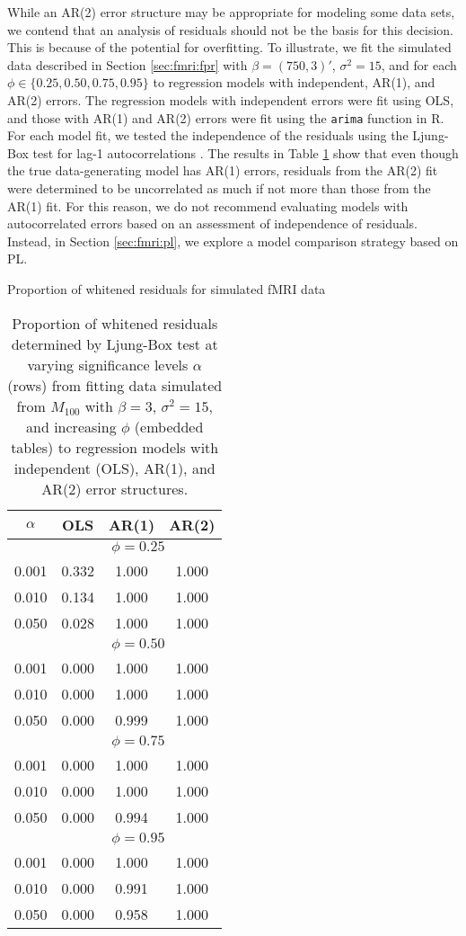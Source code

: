 While an AR(2) error structure may be appropriate for modeling some data sets, we contend that an analysis of residuals should not be the basis for this decision. This is because of the potential for overfitting. To illustrate, we fit the simulated data described in Section \ref{sec:fmri:fpr} with $\beta = (750,3)'$, $\sigma^2 = 15$, and for each $\phi \in \{0.25,0.50,0.75,0.95\}$ to regression models with independent, AR(1), and AR(2) errors. The regression models with independent errors were fit using OLS, and those with AR(1) and AR(2) errors were fit using the {\tt arima} function in R. For each model fit, we tested the independence of the residuals using the Ljung-Box test for lag-1 autocorrelations \citep{box:test:1978}. The results in Table \ref{tab:fmri:res} show that even though the true data-generating model has AR(1) errors, residuals from the AR(2) fit were determined to be uncorrelated as much if not more than those from the AR(1) fit. For this reason, we do not recommend evaluating models with autocorrelated errors based on an assessment of independence of residuals. Instead, in Section \ref{sec:fmri:pl}, we explore a model comparison strategy based on PL.

\begin{table}
\ssp
\centering
\caption{Proportion of whitened residuals for simulated fMRI data} \label{tab:fmri:res}
\begin{tabular}{|c|ccc|}
\hline
$\alpha$ & OLS & AR(1) & AR(2) \\
\hline
 & \multicolumn{3}{|c|}{$\phi = 0.25$} \\
\hline
0.001 & 0.332 & 1.000 & 1.000 \\
0.010 & 0.134 & 1.000 & 1.000 \\
0.050 & 0.028 & 1.000 & 1.000 \\
\hline
 & \multicolumn{3}{|c|}{$\phi = 0.50$} \\
\hline
0.001 & 0.000 & 1.000 & 1.000 \\
0.010 & 0.000 & 1.000 & 1.000 \\
0.050 & 0.000 & 0.999 & 1.000 \\
\hline
 & \multicolumn{3}{|c|}{$\phi = 0.75$} \\
\hline
0.001 & 0.000 & 1.000 & 1.000 \\
0.010 & 0.000 & 1.000 & 1.000 \\
0.050 & 0.000 & 0.994 & 1.000 \\
\hline
 & \multicolumn{3}{|c|}{$\phi = 0.95$} \\
\hline
0.001 & 0.000 & 1.000 & 1.000 \\
0.010 & 0.000 & 0.991 & 1.000 \\
0.050 & 0.000 & 0.958 & 1.000 \\
\hline
\end{tabular}
\caption*{Proportion of whitened residuals determined by Ljung-Box test at varying significance levels $\alpha$ (rows) from fitting data simulated from $M_{100}$ with $\beta = 3$, $\sigma^2 = 15$, and increasing $\phi$ (embedded tables) to regression models with independent (OLS), AR(1), and AR(2) error structures.}
\end{table}

